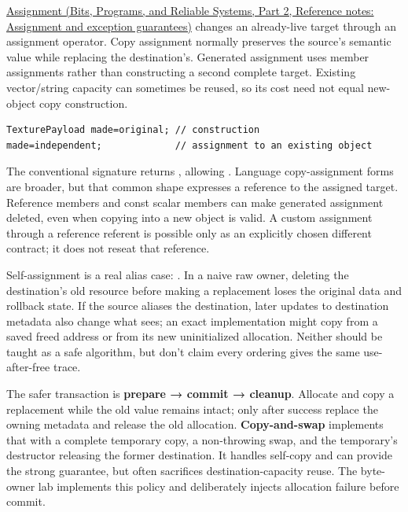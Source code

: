 \hypertarget{05-engine-i-ch003-replacing-a-value-is-not-creating-an-object}{}

\href{../01-Bits-Programs-and-Reliable-Systems-P02/main.pdf\#nameddest=appendix-bea6beb5350f}{Assignment (Bits, Programs, and Reliable Systems, Part 2, Reference notes: Assignment and exception guarantees)} changes an already-live target through an assignment operator. Copy assignment normally preserves the source's semantic value while replacing the destination's. Generated assignment uses member assignments rather than constructing a second complete target. Existing vector/string capacity can sometimes be reused, so its cost need not equal new-object copy construction.

\begin{verbatim}
TexturePayload made=original; // construction
made=independent;             // assignment to an existing object
\end{verbatim}

The conventional signature  returns , allowing . Language copy-assignment forms are broader, but that common shape expresses a reference to the assigned target. Reference members and const scalar members can make generated assignment deleted, even when copying into a new object is valid. A custom assignment through a reference referent is possible only as an explicitly chosen different contract; it does not reseat that reference.

Self-assignment is a real alias case: . In a naive raw owner, deleting the destination's old resource before making a replacement loses the original data and rollback state. If the source aliases the destination, later updates to destination metadata also change what  sees; an exact implementation might copy from a saved freed address or from its new uninitialized allocation. Neither should be taught as a safe algorithm, but don't claim every ordering gives the same use-after-free trace.

The safer transaction is \textbf{prepare → commit → cleanup}. Allocate and copy a replacement while the old value remains intact; only after success replace the owning metadata and release the old allocation. \textbf{Copy-and-swap} implements that with a complete temporary copy, a non-throwing swap, and the temporary's destructor releasing the former destination. It handles self-copy and can provide the strong guarantee, but often sacrifices destination-capacity reuse. The byte-owner lab implements this policy and deliberately injects allocation failure before commit.

